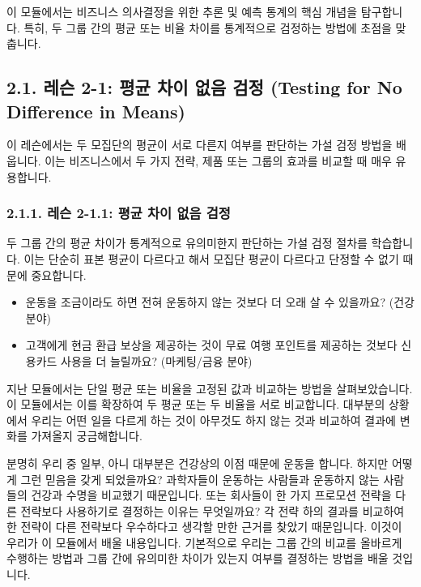 \documentclass[11pt,a4paper]{article}
\theoremstyle{definition}
\begin{document}
이 모듈에서는 비즈니스 의사결정을 위한 추론 및 예측 통계의 핵심 개념을 탐구합니다. 특히, 두 그룹 간의 평균 또는 비율 차이를 통계적으로 검정하는 방법에 초점을 맞춥니다.

\subsection{2.1. 레슨 2-1: 평균 차이 없음 검정 (Testing for No Difference in Means)}

이 레슨에서는 두 모집단의 평균이 서로 다른지 여부를 판단하는 가설 검정 방법을 배웁니다. 이는 비즈니스에서 두 가지 전략, 제품 또는 그룹의 효과를 비교할 때 매우 유용합니다.

\subsubsection*{2.1.1. 레슨 2-1.1: 평균 차이 없음 검정}

\begin{summarybox}[title=핵심 요약: 두 평균의 차이 검정]
두 그룹 간의 평균 차이가 통계적으로 유의미한지 판단하는 가설 검정 절차를 학습합니다. 이는 단순히 표본 평균이 다르다고 해서 모집단 평균이 다르다고 단정할 수 없기 때문에 중요합니다.
\end{summarybox}

\begin{examplebox}[title=생각해 볼 질문: 실제 비즈니스에서의 차이]
\begin{itemize}
    \item 운동을 조금이라도 하면 전혀 운동하지 않는 것보다 더 오래 살 수 있을까요? (건강 분야)
    \item 고객에게 현금 환급 보상을 제공하는 것이 무료 여행 포인트를 제공하는 것보다 신용카드 사용을 더 늘릴까요? (마케팅/금융 분야)
\end{itemize}
\end{examplebox}

지난 모듈에서는 단일 평균 또는 비율을 고정된 값과 비교하는 방법을 살펴보았습니다. 이 모듈에서는 이를 확장하여 두 평균 또는 두 비율을 서로 비교합니다. 대부분의 상황에서 우리는 어떤 일을 다르게 하는 것이 아무것도 하지 않는 것과 비교하여 결과에 변화를 가져올지 궁금해합니다.

분명히 우리 중 일부, 아니 대부분은 건강상의 이점 때문에 운동을 합니다. 하지만 어떻게 그런 믿음을 갖게 되었을까요? 과학자들이 운동하는 사람들과 운동하지 않는 사람들의 건강과 수명을 비교했기 때문입니다. 또는 회사들이 한 가지 프로모션 전략을 다른 전략보다 사용하기로 결정하는 이유는 무엇일까요? 각 전략 하의 결과를 비교하여 한 전략이 다른 전략보다 우수하다고 생각할 만한 근거를 찾았기 때문입니다. 이것이 우리가 이 모듈에서 배울 내용입니다. 기본적으로 우리는 그룹 간의 비교를 올바르게 수행하는 방법과 그룹 간에 유의미한 차이가 있는지 여부를 결정하는 방법을 배울 것입니다.
\end{document}

